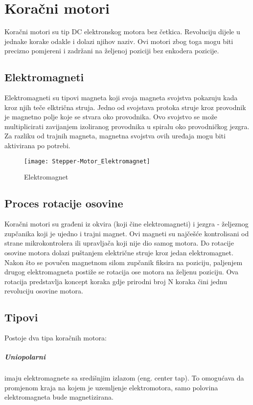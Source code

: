 \documentclass[../Document.tex]{subfiles}
\begin{document}
\section{Koračni motori}
Koračni motori su tip DC elektronskog motora bez četkica. Revoluciju dijele u jednake korake odakle i dolazi njihov naziv. Ovi motori zbog toga mogu biti precizno pomjereni i zadržani na željenoj poziciji bez enkodera pozicije.
\vspace{0.5cm}
\subsection{Elektromagneti}
Elektromagneti su tipovi magneta koji svoja magneta svojstva pokazuju kada kroz njih teče elktrična struja. Jedno od svojstava protoka struje kroz provodnik je magnetno polje koje se stvara oko provodnika. Ovo svojstvo se može multiplicirati zavijanjem izoliranog provodnika u spiralu oko provodničkog jezgra. Za razliku od trajnih magneta, magnetna svojstva ovih uređaja mogu biti aktivirana po potrebi.\\

\begin{figure}[h]
    \centering
    \hspace{1.8cm}
    \texttt{[image: Stepper-Motor\_Elektromagnet]}
    \caption{Elektromagnet}
\end{figure}

\subsection{Proces rotacije osovine}
Koračni motori su građeni iz okvira (koji čine elektromagneti) i jezgra - željeznog zupčanika koji je ujedno i trajni magnet. Ovi magneti su najčešće kontrolisani od strane mikrokontrolera ili upravljača koji nije dio samog motora. Do rotacije osovine motora dolazi puštanjem električne struje kroz jedan elektromagnet. Nakon što se povučen magnetnom silom zupčanik fiksira na poziciju, paljenjem drugog elektromagneta postiže se rotacija ose motora na željenu poziciju. Ova rotacija predstavlja koncept koraka gdje prirodni broj N koraka čini jednu revoluciju osovine motora.

\subsection{Tipovi}
Postoje dva tipa koračnih motora:

\subparagraph{Uniopolarni} \noindent imaju elektromagnete sa središnjim izlazom (eng. center tap). To omogućava da promjenom kraja na kojem je uzemljenje elektromotora, samo polovina elektromagneta bude magnetizirana.\\
\end{document}
